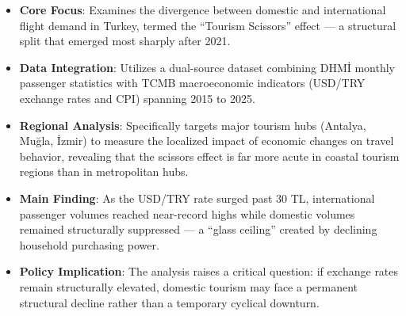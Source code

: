 \documentclass[
  11pt,
  a4paper,
  DIV=11,
  numbers=noendperiod]{scrartcl}
\providecommand{\tightlist}{%
  \setlength{\itemsep}{0pt}\setlength{\parskip}{0pt}}
\begin{document}
\begin{itemize}
\tightlist
\item
  \textbf{Core Focus}: Examines the divergence between domestic and
  international flight demand in Turkey, termed the ``Tourism Scissors''
  effect --- a structural split that emerged most sharply after 2021.
\item
  \textbf{Data Integration}: Utilizes a dual-source dataset combining
  DHMİ monthly passenger statistics with TCMB macroeconomic indicators
  (USD/TRY exchange rates and CPI) spanning 2015 to 2025.
\item
  \textbf{Regional Analysis}: Specifically targets major tourism hubs
  (Antalya, Muğla, İzmir) to measure the localized impact of economic
  changes on travel behavior, revealing that the scissors effect is far
  more acute in coastal tourism regions than in metropolitan hubs.
\item
  \textbf{Main Finding}: As the USD/TRY rate surged past 30 TL,
  international passenger volumes reached near-record highs while
  domestic volumes remained structurally suppressed --- a ``glass
  ceiling'' created by declining household purchasing power.
\item
  \textbf{Policy Implication}: The analysis raises a critical question:
  if exchange rates remain structurally elevated, domestic tourism may
  face a permanent structural decline rather than a temporary cyclical
  downturn.
\end{itemize}
\end{document}
